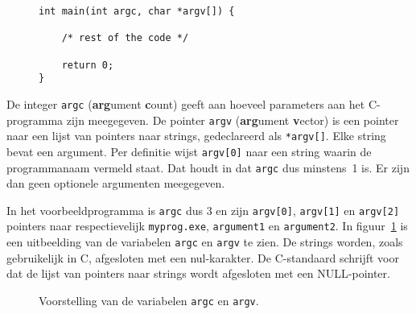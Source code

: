 \begin{figure}[!ht]
\begin{lstlisting}[caption=Declaratie van de command line parameters.,label=cod:poiargs]
int main(int argc, char *argv[]) {

    /* rest of the code */
    
    return 0;
}
\end{lstlisting}
\end{figure}

De integer \texttt{argc} (\textbf{arg}ument \textbf{c}ount) geeft aan hoeveel parameters aan het C-programma zijn meegegeven. De pointer \texttt{argv} (\textbf{arg}ument \textbf{v}ector) is  een pointer naar een lijst van pointers naar strings, gedeclareerd als \texttt{*argv[]}. Elke string bevat een argument. Per definitie wijst \texttt{argv[0]} naar een string waarin de programmanaam vermeld staat. Dat houdt in dat \texttt{argc} dus minstens~1 is. Er zijn dan geen optionele argumenten meegegeven.

In het voorbeeldprogramma is \texttt{argc} dus 3 en zijn \texttt{argv[0]}, \texttt{argv[1]} en \texttt{argv[2]} pointers naar respectievelijk \texttt{myprog.exe}, \texttt{argument1} en \texttt{argument2}. In figuur~\ref{fig:poiargcargv} is een uitbeelding van de variabelen \texttt{argc} en \texttt{argv} te zien. De strings worden, zoals gebruikelijk in C,  afgesloten met een nul-karakter. De C-standaard schrijft voor dat de lijst van pointers naar strings wordt afgesloten met een NULL-pointer.

\begin{figure}[!ht]
\centering
{}
\caption{Voorstelling van de variabelen \texttt{argc} en \texttt{argv}.}
\label{fig:poiargcargv}
\end{figure}

